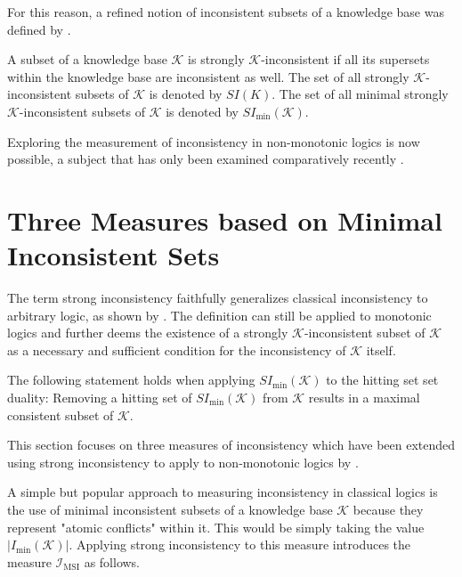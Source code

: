 For this reason, a refined notion of inconsistent subsets of a knowledge base was defined by \cite{brewka_strong_2017}.
\begin{definition}
    A subset of a knowledge base \(\mathcal{K}\) is strongly \(\mathcal{K}\)-inconsistent if all its supersets within the knowledge base are inconsistent as well. The set of all strongly \(\mathcal{K}\)-inconsistent subsets of \(\mathcal{K}\) is denoted by \(SI(K)\). The set of all minimal strongly \(\mathcal{K}\)-inconsistent subsets of \(\mathcal{K}\) is denoted by \(SI_{\min}(\mathcal{K})\).
\end{definition}

Exploring the measurement of inconsistency in non-monotonic logics is now possible, a subject that has only been examined comparatively recently \cite{ulbricht_measuring_2018} \cite{brewka_strong_2019} \cite{ulbricht_handling_2020}.

\section{Three Measures based on Minimal Inconsistent Sets}
The term strong inconsistency faithfully generalizes classical inconsistency to arbitrary logic, as shown by \cite{brewka_strong_2017}. The definition can still be applied to monotonic logics and further deems the existence of a strongly \(\mathcal{K}\)-inconsistent subset of \(\mathcal{K}\) as a necessary and sufficient condition for the inconsistency of \(\mathcal{K}\) itself.

\begin{theorem}
    The following statement holds when applying \(SI_{\min}(\mathcal{K})\) to the hitting set set duality:
    Removing a hitting set of \(SI_{\min}(\mathcal{K})\) from \(\mathcal{K}\) results in a maximal consistent subset of \(\mathcal{K}\).
\end{theorem}

This section focuses on three measures of inconsistency which have been extended using strong inconsistency to apply to non-monotonic logics by \cite{ulbricht_handling_2020}.

A simple but popular approach to measuring inconsistency in classical logics is the use of minimal inconsistent subsets of a knowledge base \(\mathcal{K}\) because they represent "atomic conflicts" within it. This would be simply taking the value \(\left| I_{\min}(\mathcal{K}) \right|\). Applying strong inconsistency to this measure introduces the measure \(\mathcal{I}_{\text{MSI}}\) as follows.

